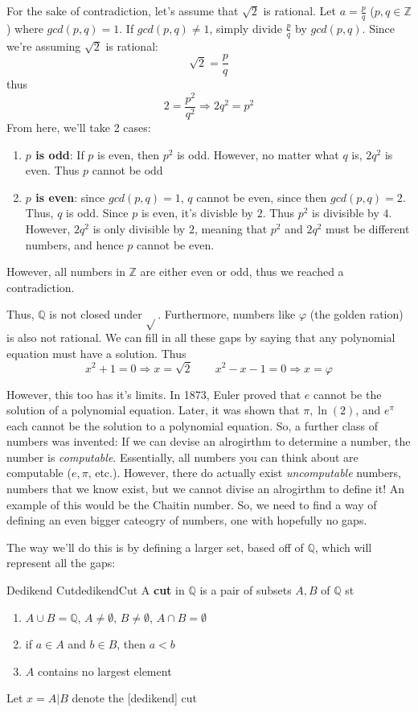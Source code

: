 \documentclass{book}
\newcommand{\Q}{{\mathbb{Q}}}
\newcommand{\Z}{{\mathbb{Z}}}
\newcommand{\Rw}{\Rightarrow}
\renewcommand{\bf}[1]{\textbf{#1}}
\let\temp\phi
\let\phi\varphi
\let\varphi\temp
\newenvironment{Proof}[1][]
  {\begin{ProofTcb}[#1]}
  {\end{ProofTcb}}
\begin{document}
\begin{Proof}
	For the sake of contradiction, let's assume that $\sqrt{2}$ is rational. Let $a = \frac{p}{q}$ ($p,q \in \Z$) where $gcd(p,q) = 1$.
	If $gcd(p,q) \ne 1$, simply divide $\frac{p}{q}$ by $gcd(p,q)$. Since we're assuming $\sqrt{2}$ is rational:
	\[
		\sqrt{2} = \frac{p}{q}
	\]
	thus
	\[
		2 = \frac{p^2}{q^2} \Rw 2q^{2} = p^2
	\]
	From here, we'll take 2 cases:
	\begin{enumerate}
		\item[] \bf{$p$ is odd}: If $p$ is even, then $p^2$ is odd. However, no matter what $q$ is, $2q^{2}$ is even. Thus
			$p$ cannot be odd
		\item[] \bf{$p$ is even}: since $gcd(p,q) = 1$, $q$ cannot be even, since then $gcd(p,q) = 2$. Thus, $q$ is odd.
			Since $p$ is even, it's divisble by $2$. Thus $p^2$ is divisible by $4$. However, $2q^2$ is only divisible
			by $2$, meaning that $p^2$ and $2q^2$ must be different numbers, and hence $p$ cannot be even.
	\end{enumerate}
	However, all numbers in $\Z$ are either even or odd, thus we reached a contradiction.
\end{Proof}

Thus, $\Q$ is not closed under $\sqrt{}$. Furthermore, numbers like $\phi$ (the golden ration) is also not rational.  We can fill in all these
gaps by saying that any polynomial equation must have a solution. Thus
\[
	x^2 + 1 = 0 \Rw x = \sqrt{2} \qquad x^2 - x - 1 = 0 \Rw x = \phi
\]

However, this too has it's limits. In 1873, Euler proved that $e$ cannot be the solution of a polynomial equation.
Later, it was shown that $\pi, \ln(2)$, and $e^\pi$ each cannot be the solution to a polynomial equation. So, a further
class of numbers was invented: If we can devise an alrogirthm to determine a number, the number is \emph{computable}.
Essentially, all numbers you can think about are computable ($e, \pi$, etc.). However, there do actually exist
\emph{uncomputable} numbers, numbers that we know exist, but we cannot divise an alrogirthm to define it! An example of
this would be the Chaitin number. So, we need to find a way of defining an even bigger cateogry of numbers, one with
hopefully no gaps.

The way we'll do this is by defining a larger set, based off of $\Q$, which will represent all the gaps:
\begin{defn}{Dedikend Cut}{dedikendCut}
	A \bf{cut} in $\Q$ is a pair of subsets $A, B$ of $\Q$ st
	\begin{enumerate}
		\item $A\cup B = \Q$, $A \ne \emptyset$, $B \ne \emptyset$, $A\cap B = \emptyset$
		\item if $a \in A$ and $b \in B$, then $a < b$
		\item $A$ contains no largest element
	\end{enumerate}
	Let $x = A|B$ denote the [dedikend] cut
\end{defn}
\end{document}
